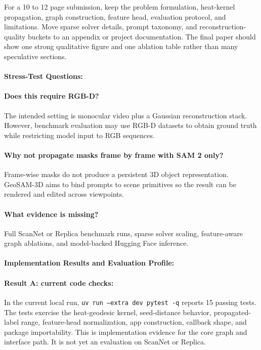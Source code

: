 \documentclass{article}
\begin{document}
For a 10 to 12 page submission, keep the problem formulation, heat-kernel propagation, graph construction, feature head, evaluation protocol, and limitations. Move sparse solver details, prompt taxonomy, and reconstruction-quality buckets to an appendix or project documentation. The final paper should show one strong qualitative figure and one ablation table rather than many speculative sections.

\paragraph{Stress-Test Questions:}

\paragraph{Does this require RGB-D?}
The intended setting is monocular video plus a Gaussian reconstruction stack. However, benchmark evaluation may use RGB-D datasets to obtain ground truth while restricting model input to RGB sequences.

\paragraph{Why not propagate masks frame by frame with SAM 2 only?}
Frame-wise masks do not produce a persistent 3D object representation. GeoSAM-3D aims to bind prompts to scene primitives so the result can be rendered and edited across viewpoints.

\paragraph{What evidence is missing?}
Full ScanNet or Replica benchmark runs, sparse solver scaling, feature-aware graph ablations, and model-backed Hugging Face inference.

\paragraph{Implementation Results and Evaluation Profile:}

\paragraph{Result A: current code checks:}

In the current local run, \texttt{uv run --extra dev pytest -q} reports 15 passing tests. The tests exercise the heat-geodesic kernel, seed-distance behavior, propagated-label range, feature-head normalization, app construction, callback shape, and package importability. This is implementation evidence for the core graph and interface path. It is not yet an evaluation on ScanNet or Replica.
\end{document}
